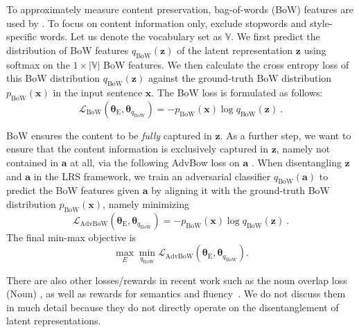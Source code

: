 To approximately measure content preservation, bag-of-words (BoW) features are used by .
To focus on content information only,  exclude
stopwords and style-specific words.
Let us denote the vocabulary set as $\mathbb{V}$. We first predict the distribution of BoW features $q_{\mathrm{BoW}}(\bm{z})$ of the latent representation $\bm{z}$ using softmax on the $1 \times |\mathbb{V}|$ BoW features. We then calculate the cross entropy loss of this BoW distribution $q_{\mathrm{BoW}}(\bm{z})$ against the ground-truth BoW distribution $p_{\mathrm{BoW}}(\bm{x})$ in the input sentence $\bm{x}$.
The BoW loss is formulated as follows:
\begin{equation}
\label{equation:BoW}
    \mathcal{L}_{\mathrm{BoW}}(\bm{\theta}_{\mathrm{E}},\bm{\theta}_{q_{\mathrm{BoW}}})=-p_{\mathrm{BoW}}(\bm{x}) \log q_{\mathrm{BoW}}(\bm{z})
    ~.
\end{equation}

BoW ensures the content to be \textit{fully} captured in $\bm{z}$. As a further step, we want to ensure that the content information is exclusively captured in $\bm{z}$, namely not contained in $\bm{a}$ at all, via the following AdvBow loss on $\bm{a}$ .
When disentangling $\bm{z}$ and $\bm{a}$ in the LRS framework, 
we train an adversarial classifier $q_{\mathrm{BoW}}(\bm{a})$ to predict the BoW features given $\bm{a}$ by aligning it with the ground-truth BoW distribution $p_{\mathrm{BoW}}(\bm{x})$, namely minimizing
\begin{equation}
\label{equation:AdvBoW}
    \mathcal{L}_{\mathrm{AdvBoW}}(\bm{\theta}_{\mathrm{E}},\bm{\theta}_{q_{\mathrm{BoW}}})=-p_{\mathrm{BoW}}(\bm{x}) \log q_{\mathrm{BoW}}(\bm{z})
    ~.
\end{equation}
The final min-max objective is
\begin{equation}
    \max_{E} \min_{q_{\mathrm{BoW}}} \mathcal{L}_{\mathrm{AdvBoW}}(\bm{\theta}_{\mathrm{E}},\bm{\theta}_{q_{\mathrm{BoW}}}).
\end{equation}

There are also other losses/rewards in recent work such as the noun overlap loss (Noun) , as well as rewards for semantics and fluency~. We do not discuss them in much detail because they do not directly operate on the disentanglement of latent representations.

